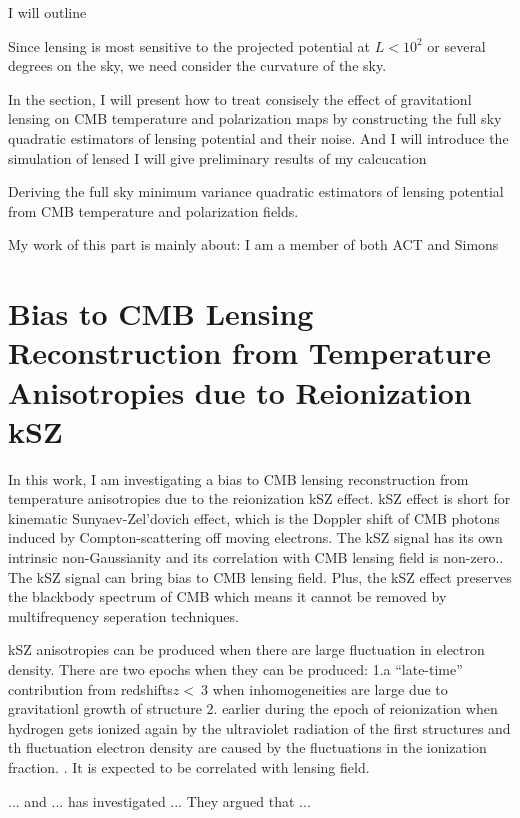\documentclass[12pt, notitlepage, onecolumn, amsmath, amssymb, aps]{revtex4-1}
\begin{document}
I will outline 

Since lensing is most sensitive to the projected potential at \(L<10^2\) or several degrees on the sky, we need consider the curvature of the sky. 


In the section, I will present how to treat consisely the effect of gravitationl lensing on CMB temperature and polarization maps by constructing the full sky quadratic estimators of lensing potential and their noise. And I will introduce the simulation of lensed I will give preliminary results of my calcucation 

Deriving the full sky minimum variance quadratic estimators of lensing potential from CMB temperature and polarization fields.

My work of this part is mainly about:
I am a member of both ACT and Simons

\section{Bias to CMB Lensing Reconstruction from Temperature Anisotropies due to Reionization kSZ}
\label{sec:org093d799}

In this work, I am investigating a bias to CMB lensing reconstruction from temperature anisotropies due to the reionization kSZ effect. kSZ effect is short for kinematic Sunyaev-Zel'dovich effect, which is the Doppler shift of CMB photons induced by Compton-scattering off moving electrons.\cite{Ferraro:2017fac}
The kSZ signal has its own intrinsic non-Gaussianity and its correlation with CMB lensing field is non-zero.\cite{Smith:2016lnt}. The kSZ signal can bring bias to CMB lensing field. Plus, the kSZ effect preserves the blackbody spectrum of CMB which means it cannot be removed by multifrequency seperation techniques.\cite{Smith:2009pn}


kSZ anisotropies can be produced when there are large fluctuation in electron density. There are two epochs when they can be produced: 1.a ``late-time'' contribution from redshifts\(z<~3\) when inhomogeneities are large due to gravitationl growth of structure 2. earlier during the epoch of reionization when hydrogen gets ionized again by the ultraviolet radiation of the first structures and th fluctuation electron density are caused by the fluctuations in the ionization fraction.\cite{Ferraro:2017fac} \cite{Alvarez:2015xzu}. It is expected to be correlated with lensing field.\cite{Ferraro:2017fac}

... and ... has investigated ...
They argued that ...
\end{document}
